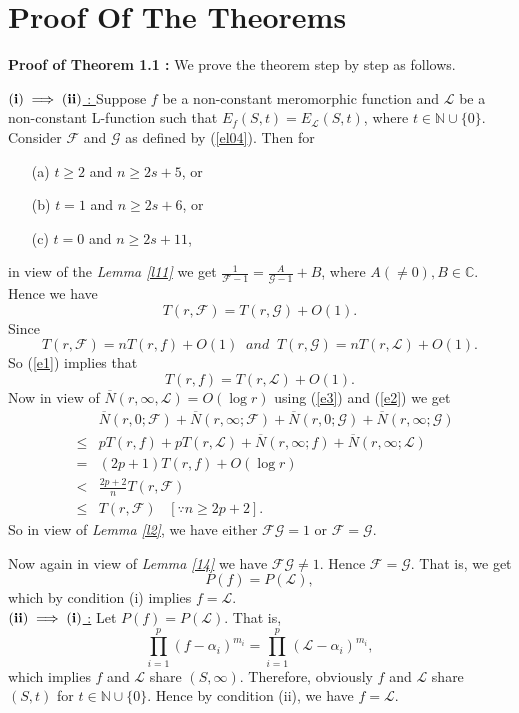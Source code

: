 \documentclass[a4paper,draft]{amsproc}
\theoremstyle{plain}
\theoremstyle{definition}
\theoremstyle{remark}
\newcommand{\ol}{\overline}
\newcommand{\be}{\begin{equation}}
\newcommand{\ee}{\end{equation}}
\newcommand{\beas}{\begin{eqnarray*}}
\newcommand{\eeas}{\end{eqnarray*}}
\renewcommand{\d}{\displaystyle}
\numberwithin{equation}{section}
\renewcommand{\leq}{\leqslant}\renewcommand{\geq}{\geqslant}
\begin{document}
\section{Proof Of The Theorems}

{\bf Proof of  Theorem 1.1 :} 
We  prove the theorem step by step as follows.

\underline{$\bf{(i) \implies (ii)}$ :
} Suppose $f$ be a non-constant meromorphic function and $\mathcal{L}$ be a non-constant L-function such that  %
$E_f(S,t)=E_{\mathcal{L}}(S,t)$, where $t\in\mathbb{N}\cup\{0\}$. Consider $\mathcal
{F}$ and $\mathcal
{G}$ as defined by (\ref{el04}). Then for \begin{itemize}
\item [(a)]$t\geq 2$ and $n\geq 2s+5$, or
\item [(b)] $t=1$ and $n\geq 2s+6$, or
\item [(c)]$t=0$ and $n\geq 2s+11$,
\end{itemize} in view of the {\em Lemma \ref{l11}} we get 
$\d\frac{1}{\mathcal
{F}-1}=\frac{A}{\mathcal
{G}-1}+B$, where $A(\neq0), B\in \mathbb{C}$.
Hence we have \be\label{e1}T(r,\mathcal{F})=T(r,\mathcal{G})+O(1).\ee Since  \be\label{e3} T(r,\mathcal{F})=nT(r,f)+O(1)\;\; and\;\; T(r,\mathcal{G})=nT(r,\mathcal{L})+O(1).\ee So (\ref{e1}) implies that
\be\label{e2}T(r,f)=T(r,\mathcal{\mathcal{L}})+O(1).\ee
Now in view of $\ol{N}(r,\infty,\mathcal{L})=O(\log r)$ using (\ref{e3}) and (\ref{e2}) we get 
\beas &&
\ol{N}(r,0; \mathcal{F})+	\ol{N}(r,\infty; \mathcal{F})+	\ol{N}(r,0; \mathcal{G})+	\ol{N}(r,\infty; \mathcal{G})\\ &\leq& pT(r,f)+pT(r,\mathcal{L})+\ol N(r,\infty;f)+\ol N(r,\infty;\mathcal{L})\\
&=&(2p+1)T(r,f)+O(\log r)\\
&<&\frac{2p+2}{n}T(r,\mathcal{F})\\&\leq& T(r,\mathcal{F}) \;\;\; [\because n \geq 2p + 2].
\eeas
So in view of {\em Lemma \ref{l2}}, we have either $\mathcal{F}\mathcal{G} = 1$ or $\mathcal{F} = \mathcal{G}$.

Now again in view of {\em Lemma \ref{14}} we have $\mathcal{F} \mathcal{G}\neq 1$. Hence $\mathcal{F}= \mathcal{G}$. That is, we get 
\be\nonumber
P(f)=
P(\mathcal{L}),
\ee
which by condition (i) implies $f=\mathcal{L}$.\\

\underline{$\bf{(ii)\implies (i)}$ :}
Let $P(f)=P(\mathcal{L})$. That is, 
$$\prod_{i=1}^{p}(f-\alpha_i)^{m_i}=\prod_{i=1}^{p}(\mathcal{L}-\alpha_i)^{m_i},$$ which implies $f$ and $\mathcal{L}$ share $(S,\infty)$. Therefore, obviously $f$ and $\mathcal{L}$ share $(S,t)$ for $t\in\mathbb{N}\cup\{0\}$. Hence by condition (ii), we have $f= \mathcal{L}$. \\
\end{document}
